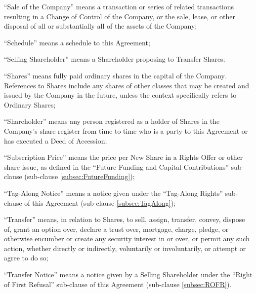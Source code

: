 ``Sale of the Company'' means a transaction or series of related transactions resulting in a Change of Control of the Company, or the sale, lease, or other disposal of all or substantially all of the assets of the Company;

``Schedule'' means a schedule to this Agreement;

``Selling Shareholder'' means a Shareholder proposing to Transfer Shares;

``Shares'' means fully paid ordinary shares in the capital of the Company. References to Shares include any shares of other classes that may be created and issued by the Company in the future, unless the context specifically refers to Ordinary Shares;

``Shareholder'' means any person registered as a holder of Shares in the Company's share register from time to time who is a party to this Agreement or has executed a Deed of Accession;

``Subscription Price'' means the price per New Share in a Rights Offer or other share issue, as defined in the ``Future Funding and Capital Contributions'' sub-clause (sub-clause \ref{subsec:FutureFunding});

``Tag-Along Notice'' means a notice given under the ``Tag-Along Rights'' sub-clause of this Agreement (sub-clause \ref{subsec:TagAlong});

``Transfer'' means, in relation to Shares, to sell, assign, transfer, convey, dispose of, grant an option over, declare a trust over, mortgage, charge, pledge, or otherwise encumber or create any security interest in or over, or permit any such action, whether directly or indirectly, voluntarily or involuntarily, or attempt or agree to do so;

``Transfer Notice'' means a notice given by a Selling Shareholder under the ``Right of First Refusal'' sub-clause of this Agreement (sub-clause \ref{subsec:ROFR}).


